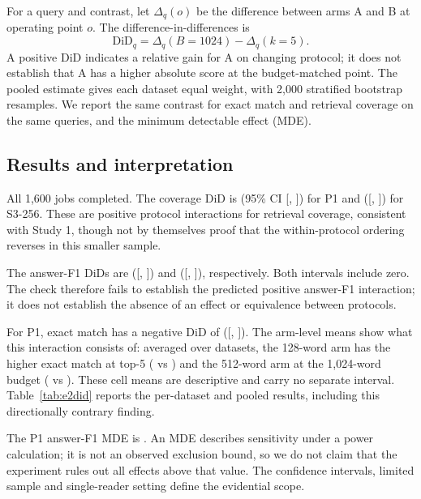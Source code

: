 \documentclass[11pt]{article}
\begin{document}
For a query and contrast, let $\Delta_q(o)$ be the difference between arms A and B at operating point $o$. The
difference-in-differences is
\begin{equation}
 \mathrm{DiD}_q=\Delta_q(B=1024)-\Delta_q(k=5).
 \label{eq:did}
\end{equation}
A positive DiD indicates a relative gain for A on changing protocol; it does not establish that A has a higher absolute
score at the budget-matched point. The pooled estimate gives each dataset equal weight, with 2,000 stratified bootstrap
resamples. We report the same contrast for exact match and retrieval coverage on the same queries, and the minimum
detectable effect (MDE).

\subsection{Results and interpretation}
All 1,600 jobs completed. The coverage DiD is \EtwoPoneCov{} (95\% CI [\EtwoPoneCovLo, \EtwoPoneCovHi]) for P1 and
\EtwoSthreeCov{} ([\EtwoSthreeCovLo, \EtwoSthreeCovHi]) for S3-256. These are positive protocol interactions for
retrieval coverage, consistent with Study 1, though not by themselves proof that the within-protocol ordering reverses
in this smaller sample.

The answer-F1 DiDs are \EtwoPoneFone{} ([\EtwoPoneFoneLo, \EtwoPoneFoneHi]) and \EtwoSthreeFone{}
([\EtwoSthreeFoneLo, \EtwoSthreeFoneHi]), respectively. Both intervals include zero. The check therefore fails to
establish the predicted positive answer-F1 interaction; it does not establish the absence of an effect or equivalence
between protocols.

For P1, exact match has a negative DiD of \EtwoPoneEm{} ([\EtwoPoneEmLo, \EtwoPoneEmHi]). The arm-level means show
what this interaction consists of: averaged over datasets, the 128-word arm has the higher exact match at top-5
(\EtwoEmOneTwoEightCount{} vs \EtwoEmFiveTwelveCount) and the 512-word arm at the 1,024-word budget
(\EtwoEmFiveTwelveBudget{} vs \EtwoEmOneTwoEightBudget). These cell means are descriptive and carry no separate
interval. Table~\ref{tab:e2did} reports the per-dataset and pooled results, including this directionally contrary
finding.



The P1 answer-F1 MDE is \EtwoPoneFoneMde. An MDE describes sensitivity under a power calculation; it is not an observed
exclusion bound, so we do not claim that the experiment rules out all effects above that value. The confidence
intervals, limited sample and single-reader setting define the evidential scope.
\end{document}
